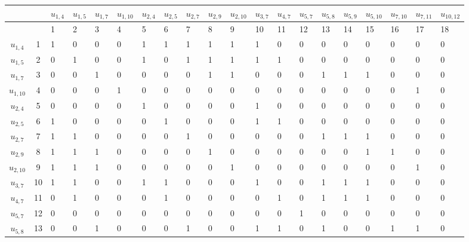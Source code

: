 \documentclass[12pt, a4paper] {ncc}
\begin{document}
{\scriptsize\begin{tabularx}{\textwidth}{|c| c|X X X X X X X X X X X X X X X X X X}
\hline
& & $u_{1,4}$ & $u_{1,5}$ & $u_{1,7}$ & $u_{1,10}$ & $u_{2,4}$ & $u_{2,5}$ & $u_{2,7}$ & $u_{2,9}$ & $u_{2,10}$ & $u_{3,7}$ & $u_{4,7}$ & $u_{5,7}$ & $u_{5,8}$ & $u_{5,9}$ & $u_{5,10}$ & $u_{7,10}$ & $u_{7,11}$ & $u_{10,12}$ \\ \hline
& & 1 & 2 & 3 & 4 & 5 & 6 & 7 & 8& 9 & 10 & 11 & 12 & 13 & 14 & 15 & 16 & 17 & 18 \\ \hline
$u_{1,4}$   & 1  & 1 & 0 & 0  & 0  & 1  & 1 & 1  & 1  & 1  & 1  & 0  & 0  & 0  & 0  & 0  & 0  & 0   & 0 \\ \hline
$u_{1,5}$   & 2  & 0 & 1 & 0  & 0  & 1  & 0 & 1  & 1  & 1  & 1  & 1  & 0  & 0  & 0  & 0  & 0  & 0   & 0 \\ \hline
$u_{1,7}$   & 3  & 0 & 0 & 1  & 0  & 0  & 0 & 0  & 1  & 1  & 0  & 0  & 0  & 1  & 1  & 1  & 0  & 0   & 0 \\ \hline
$u_{1,10}$  & 4  & 0 & 0 & 0  & 1  & 0  & 0 & 0  & 0  & 0  & 0  & 0  & 0  & 0  & 0  & 0  & 0  & 1   & 0 \\ \hline
$u_{2,4}$   & 5  & 0 & 0 & 0  & 0  & 1  & 0 & 0  & 0  & 0  & 1  & 0  & 0  & 0  & 0  & 0  & 0  & 0   & 0 \\ \hline
$u_{2,5}$   & 6  & 1 & 0 & 0  & 0  & 0  & 1 & 0  & 0  & 0  & 1  & 1  & 0  & 0  & 0  & 0  & 0  & 0   & 0 \\ \hline
$u_{2,7}$   & 7  & 1 & 1 & 0  & 0  & 0  & 0 & 1  & 0  & 0  & 0  & 0  & 0  & 1  & 1  & 1  & 0  & 0   & 0 \\ \hline
$u_{2,9}$   & 8  & 1 & 1 & 1  & 0  & 0  & 0 & 0  & 1  & 0  & 0  & 0  & 0  & 0  & 0  & 1  & 1  & 0   & 0 \\ \hline
$u_{2,10}$  & 9  & 1 & 1 & 1  & 0  & 0  & 0 & 0  & 0  & 1  & 0  & 0  & 0  & 0  & 0  & 0  & 0  & 1   & 0 \\ \hline
$u_{3,7}$   &10  & 1 & 1 & 0  & 0  & 1  & 1 & 0  & 0  & 0  & 1  & 0  & 0  & 1  & 1  & 1  & 0  & 0   & 0 \\ \hline
$u_{4,7}$   &11  & 0 & 1 & 0  & 0  & 0  & 1 & 0  & 0  & 0  & 0  & 1  & 0  & 1  & 1  & 1  & 0  & 0   & 0 \\ \hline
$u_{5,7}$   &12  & 0 & 0 & 0  & 0  & 0  & 0 & 0  & 0  & 0  & 0  & 0  & 1  & 0  & 0  & 0  & 0  & 0   & 0 \\ \hline
$u_{5,8}$   &13  & 0 & 0 & 1  & 0  & 0  & 0 & 1  & 0  & 0  & 1  & 1  & 0  & 1  & 0  & 0  & 1  & 1   & 0 \\ \hline

\end{tabularx}}
\end{document}
